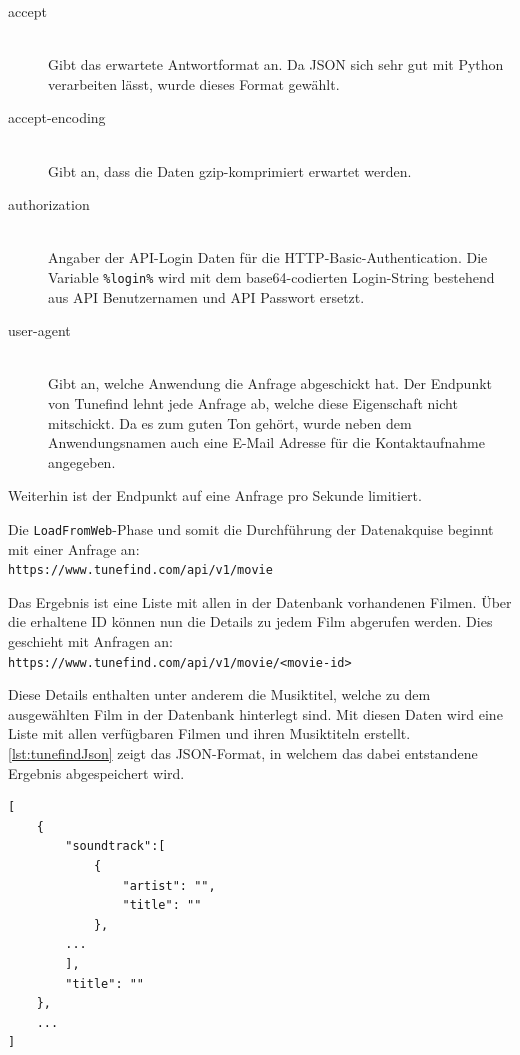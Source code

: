 \documentclass[parskip]{scrartcl}
\begin{document}
\begin{description}
    \item[accept] \hfill \\
        Gibt das erwartete Antwortformat an. Da JSON sich sehr gut mit Python verarbeiten lässt, wurde dieses Format gewählt.
    \item[accept-encoding] \hfill \\
        Gibt an, dass die Daten gzip-komprimiert erwartet werden.
    \item[authorization] \hfill \\
        Angaber der API-Login Daten für die HTTP-Basic-Authentication.
        Die Variable \texttt{\%login\%} wird mit dem base64-codierten Login-String bestehend aus API Benutzernamen und API Passwort ersetzt.
    \item[user-agent] \hfill \\
        Gibt an, welche Anwendung die Anfrage abgeschickt hat. Der Endpunkt von Tunefind lehnt jede Anfrage ab, welche diese Eigenschaft nicht mitschickt. Da es zum guten Ton gehört, wurde neben dem Anwendungsnamen auch eine E-Mail Adresse für die Kontaktaufnahme angegeben.
\end{description}

Weiterhin ist der Endpunkt auf eine Anfrage pro Sekunde limitiert.

Die \texttt{LoadFromWeb}-Phase und somit die Durchführung der Datenakquise beginnt mit einer Anfrage an:\\
\texttt{https://www.tunefind.com/api/v1/movie}

Das Ergebnis ist eine Liste mit allen in der Datenbank vorhandenen Filmen. Über die erhaltene ID können nun die Details zu jedem Film abgerufen werden. Dies geschieht mit Anfragen an:\\
\texttt{https://www.tunefind.com/api/v1/movie/<movie-id>}

Diese Details enthalten unter anderem die Musiktitel, welche zu dem ausgewählten Film in der Datenbank hinterlegt sind.
Mit diesen Daten wird eine Liste mit allen verfügbaren Filmen und ihren Musiktiteln erstellt. \autoref{lst:tunefindJson} zeigt das JSON-Format, in welchem das dabei entstandene Ergebnis abgespeichert wird.

\begin{lstlisting}[caption={Tunefind JSON-Format}, label={lst:tunefindJson}]
[  
    {  
        "soundtrack":[  
            {
                "artist": "",
                "title": ""
            },
        ...
        ],
        "title": ""
    },
    ...
]
\end{lstlisting}
\end{document}

